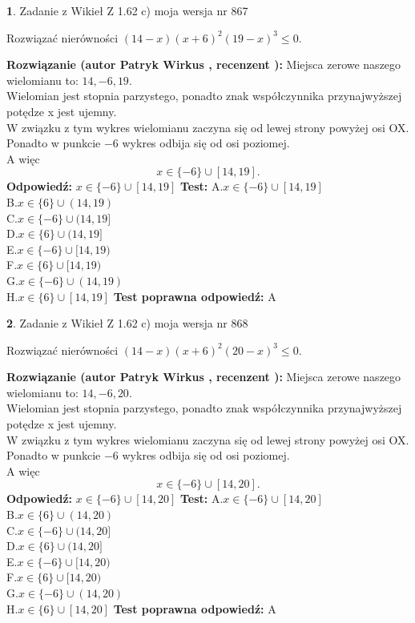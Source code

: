 \documentclass[12pt, a4paper]{article}
\theoremstyle{definition} %
\newtheorem{zad}{}
\newcommand{\zadStart}[1]{\begin{zad}#1\newline}
\newcommand{\zadStop}{\end{zad}}
\newcommand{\rozwStart}[2]{\noindent \textbf{Rozwiązanie (autor #1 , recenzent #2): }\newline}
\newcommand{\rozwStop}{\newline}
\newcommand{\odpStart}{\noindent \textbf{Odpowiedź:}\newline}
\newcommand{\odpStop}{\newline}
\newcommand{\testStart}{\noindent \textbf{Test:}\newline}
\newcommand{\testStop}{\newline}
\newcommand{\kluczStart}{\noindent \textbf{Test poprawna odpowiedź:}\newline}
\newcommand{\kluczStop}{\newline}
\begin{document}
\zadStart{Zadanie z Wikieł Z 1.62 c) moja wersja nr 867}

Rozwiązać nierówności $(14-x)(x+6)^{2}(19-x)^{3}\le0$.
\zadStop
\rozwStart{Patryk Wirkus}{}
Miejsca zerowe naszego wielomianu to: $14, -6, 19$.\\
Wielomian jest stopnia parzystego, ponadto znak współczynnika przy\linebreak najwyższej potędze x jest ujemny.\\ W związku z tym wykres wielomianu zaczyna się od lewej strony powyżej osi OX.\\
Ponadto w punkcie $-6$ wykres odbija się od osi poziomej.\\
A więc $$x \in \{-6\} \cup [14,19].$$
\rozwStop
\odpStart
$x \in \{-6\} \cup [14,19]$
\odpStop
\testStart
A.$x \in \{-6\} \cup [14,19]$\\
B.$x \in \{6\} \cup (14,19)$\\
C.$x \in \{-6\} \cup (14,19]$\\
D.$x \in \{6\} \cup (14,19]$\\
E.$x \in \{-6\} \cup [14,19)$\\
F.$x \in \{6\} \cup [14,19)$\\
G.$x \in \{-6\} \cup (14,19)$\\
H.$x \in \{6\} \cup [14,19]$
\testStop
\kluczStart
A
\kluczStop



\zadStart{Zadanie z Wikieł Z 1.62 c) moja wersja nr 868}

Rozwiązać nierówności $(14-x)(x+6)^{2}(20-x)^{3}\le0$.
\zadStop
\rozwStart{Patryk Wirkus}{}
Miejsca zerowe naszego wielomianu to: $14, -6, 20$.\\
Wielomian jest stopnia parzystego, ponadto znak współczynnika przy\linebreak najwyższej potędze x jest ujemny.\\ W związku z tym wykres wielomianu zaczyna się od lewej strony powyżej osi OX.\\
Ponadto w punkcie $-6$ wykres odbija się od osi poziomej.\\
A więc $$x \in \{-6\} \cup [14,20].$$
\rozwStop
\odpStart
$x \in \{-6\} \cup [14,20]$
\odpStop
\testStart
A.$x \in \{-6\} \cup [14,20]$\\
B.$x \in \{6\} \cup (14,20)$\\
C.$x \in \{-6\} \cup (14,20]$\\
D.$x \in \{6\} \cup (14,20]$\\
E.$x \in \{-6\} \cup [14,20)$\\
F.$x \in \{6\} \cup [14,20)$\\
G.$x \in \{-6\} \cup (14,20)$\\
H.$x \in \{6\} \cup [14,20]$
\testStop
\kluczStart
A
\kluczStop
\end{document}
